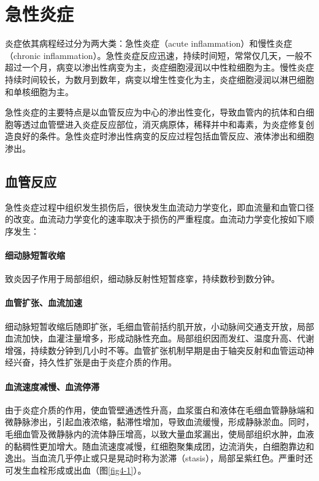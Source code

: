 \section{急性炎症}

炎症依其病程经过分为两大类：急性炎症（acute
inflammation）和慢性炎症（chronic
inflammation）。急性炎症反应迅速，持续时间短，常常仅几天，一般不超过一个月，病变以渗出性病变为主，炎症细胞浸润以中性粒细胞为主。慢性炎症持续时间较长，为数月到数年，病变以增生性变化为主，炎症细胞浸润以淋巴细胞和单核细胞为主。

急性炎症的主要特点是以血管反应为中心的渗出性变化，导致血管内的抗体和白细胞等透过血管壁进入炎症反应部位，消灭病原体，稀释并中和毒素，为炎症修复创造良好的条件。急性炎症时渗出性病变的反应过程包括血管反应、液体渗出和细胞渗出。

\subsection{血管反应}

急性炎症过程中组织发生损伤后，很快发生血流动力学变化，即血流量和血管口径的改变。血流动力学变化的速率取决于损伤的严重程度。血流动力学变化按如下顺序发生：

\paragraph{细动脉短暂收缩}
致炎因子作用于局部组织，细动脉反射性短暂痉挛，持续数秒到数分钟。

\paragraph{血管扩张、血流加速}
细动脉短暂收缩后随即扩张，毛细血管前括约肌开放，小动脉间交通支开放，局部血流加快，血灌注量增多，形成动脉性充血。局部组织因而发红、温度升高、代谢增强，持续数分钟到几小时不等。血管扩张机制早期是由于轴突反射和血管运动神经兴奋，持久性扩张是由于炎症介质的作用。

\paragraph{血流速度减慢、血流停滞}
由于炎症介质的作用，使血管壁通透性升高，血浆蛋白和液体在毛细血管静脉端和微静脉渗出，引起血液浓缩，黏滞性增加，导致血流缓慢，形成静脉淤血。同时，毛细血管及微静脉内的流体静压增高，以致大量血浆漏出，使局部组织水肿，血液的黏稠性更加增大。随血流速度减慢，红细胞聚集成团，边流消失，白细胞靠边和逸出。当血流几乎停止或只是晃动时称为淤滞（stasis），局部呈紫红色。严重时还可发生血栓形成或出血（图\ref{fig4-1}）。

